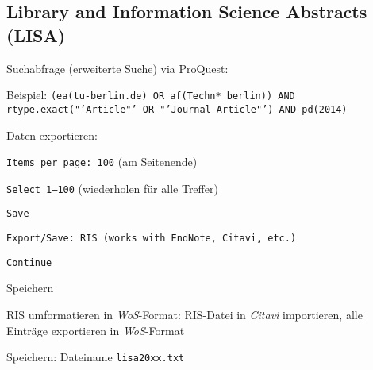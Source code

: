 \subsection*{Library and Information Science Abstracts (LISA)}
\begin{compactitem}
\item Suchabfrage (erweiterte Suche) via ProQuest: 
	\begin{compactitem}
	\item Beispiel: \texttt{(ea(tu-berlin.de) OR af(Techn* berlin)) AND rtype.exact\newline("'Article"' OR "'Journal Article"') AND pd(2014)}
	\end{compactitem}
\item Daten exportieren: 
\begin{compactitem}
    \item \texttt{Items per page: 100} (am Seitenende)
    \item \texttt{Select 1--100} (wiederholen für alle Treffer)
    \item \texttt{Save}
    \item \texttt{Export/Save: RIS (works with EndNote, Citavi, etc.)}
    \item \texttt{Continue}
    \item Speichern
	\end{compactitem}
\item RIS umformatieren in \textit{WoS}-Format: RIS-Datei in \textit{Citavi} importieren, alle Einträge exportieren in \textit{WoS}-Format
\item Speichern: Dateiname \texttt{lisa20xx.txt}
\end{compactitem}

